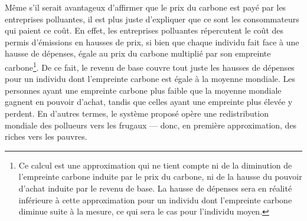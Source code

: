 \documentclass[a5paper,french]{memoir}
\begin{document}
Même s'il serait avantageux %
d'affirmer que le prix du carbone est payé par les entreprises polluantes, il est plus juste d'expliquer que ce sont les consommateurs qui paient ce coût. En effet, les entreprises polluantes répercutent le coût des permis d'émissions en hausses de prix, si bien que chaque individu fait face à une hausse de dépenses, égale au prix du carbone multiplié par son empreinte carbone\footnote{Ce calcul est une approximation qui ne tient compte ni de la diminution de l'empreinte carbone induite par le prix du carbone, ni de la hausse du pouvoir d'achat induite par le revenu de base. La hausse de dépenses sera en réalité inférieure à cette approximation pour un individu dont l'empreinte carbone diminue suite à la mesure, ce qui sera le cas pour l'individu moyen.}. De ce fait, le revenu de base couvre tout juste les hausses de dépenses pour un individu dont l'empreinte carbone est égale à la moyenne mondiale. Les personnes ayant une empreinte carbone plus faible que la moyenne mondiale gagnent en pouvoir d'achat, tandis que celles ayant une empreinte plus élevée y perdent. En d'autres termes, le système proposé opère une redistribution mondiale des pollueurs vers les frugaux --- donc, en première approximation, des riches vers les pauvres.

\end{document}
